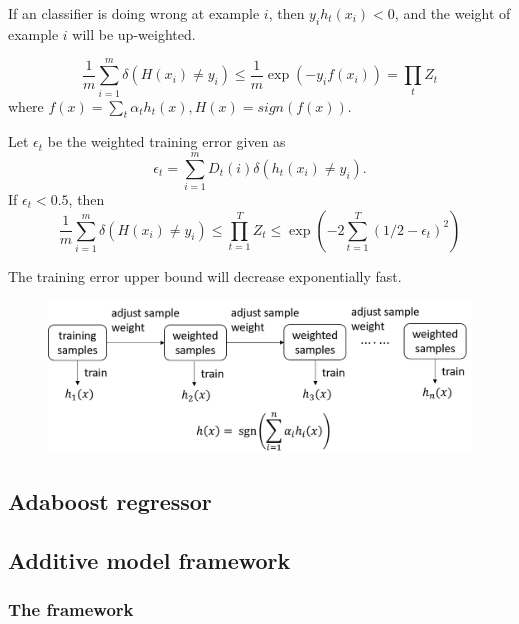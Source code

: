 \begin{refsection}
\begin{remark}
	If an classifier is doing wrong at example $i$, then $y_i h_t(x_i) < 0$, and the weight of example $i$ will be up-weighted.
\end{remark}



\begin{lemma}
$$\frac{1}{m}\sum_{i=1}^m \delta(H(x_i)\neq y_i) \leq \frac{1}{m}\exp(-y_i f(x_i)) = \prod_t Z_t$$
where $f(x) = \sum_t \alpha_t h_t(x), H(x) = sign(f(x)).$

Let $\epsilon_t$ be the weighted training error given as
$$\epsilon_t = \sum_{i=1}^m D_t(i) \delta(h_t(x_i) \neq y_i).$$
If $\epsilon_t < 0.5$, then
$$\frac{1}{m}\sum_{i=1}^m \delta(H(x_i)\neq y_i) \leq  \prod_{t=1}^T Z_t \leq \exp(-2\sum_{t=1}^T(1/2 - \epsilon_t)^2)$$
\end{lemma}


\begin{remark}[interpretation]
The training error upper bound will decrease exponentially fast.
\end{remark}


\begin{figure}[H]
	\centering
	\includegraphics[width=0.7\linewidth]{../figures/statisticalLearning/ensembleMethods/boostingLearningScheme}
	\caption{}
	\label{fig:boostinglearningscheme}
\end{figure}


\subsection{Adaboost regressor}



\subsection{Additive model framework}

\subsubsection{The framework}


\end{refsection}
